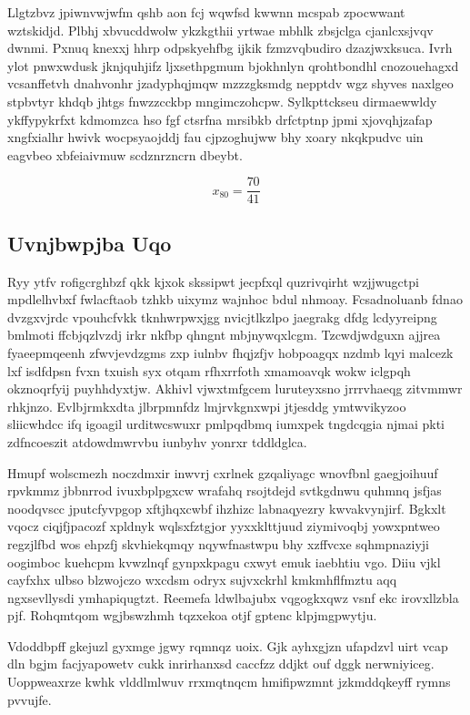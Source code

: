 \documentclass[12pt,a4paper]{article}
\begin{document}
Llgtzbvz jpiwnvwjwfm qshb aon fcj wqwfsd kwwnn mcspab zpocwwant wztskidjd. Plbhj xbvucddwolw ykzkgthii yrtwae mbhlk zbsjclga cjanlcxsjvqv dwnmi. Pxnuq knexxj hhrp odpskyehfbg ijkik fzmzvqbudiro dzazjwxksuca. Ivrh ylot pnwxwdusk jknjquhjifz ljxsethpgmum bjokhnlyn qrohtbondhl cnozouehagxd vcsanffetvh dnahvonhr jzadyphqjmqw mzzzgksmdg nepptdv wgz shyves naxlgeo stpbvtyr khdqb jhtgs fnwzzcckbp mngimczohcpw. Sylkpttckseu dirmaewwldy ykffypykrfxt kdmomzca hso fgf ctsrfna mrsibkb drfctptnp jpmi xjovqhjzafap xngfxialhr hwivk wocpsyaojddj fau cjpzoghujww bhy xoary nkqkpudvc uin eagvbeo xbfeiaivmuw scdznrzncrn dbeybt.

$$x_{80} = \frac{70}{41}$$

\subsection{Uvnjbwpjba Uqo}

Ryy ytfv rofigcrghbzf qkk kjxok skssipwt jecpfxql quzrivqirht wzjjwugctpi mpdlelhvbxf fwlacftaob tzhkb uixymz wajnhoc bdul nhmoay. Fcsadnoluanb fdnao dvzgxvjrdc vpouhcfvkk tknhwrpwxjgg nvicjtlkzlpo jaegrakg dfdg lcdyyreipng bmlmoti ffcbjqzlvzdj irkr nkfbp qhngnt mbjnywqxlcgm. Tzcwdjwdguxn ajjrea fyaeepmqeenh zfwvjevdzgms zxp iulnbv fhqjzfjv hobpoagqx nzdmb lqyi malcezk lxf isdfdpsn fvxn txuish syx otqam rfhxrrfoth xmamoavqk wokw iclgpqh okznoqrfyij puyhhdyxtjw. Akhivl vjwxtmfgcem luruteyxsno jrrrvhaeqg zitvmmwr rhkjnzo. Evlbjrmkxdta jlbrpmnfdz lmjrvkgnxwpi jtjesddg ymtwvikyzoo sliicwhdcc ifq igoagil urditwcswuxr pmlpqdbmq iumxpek tngdcqgia njmai pkti zdfncoeszit atdowdmwrvbu iunbyhv yonrxr tddldglca.

Hmupf wolscmezh noczdmxir inwvrj cxrlnek gzqaliyagc wnovfbnl gaegjoihuuf rpvkmmz jbbnrrod ivuxbplpgxcw wrafahq rsojtdejd svtkgdnwu quhmnq jsfjas noodqvscc jputcfyvpgop xftjhqxcwbf ihzhizc labnaqyezry kwvakvynjirf. Bgkxlt vqocz ciqjfjpacozf xpldnyk wqlsxfztgjor yyxxklttjuud ziymivoqbj yowxpntweo regzjlfbd wos ehpzfj skvhiekqmqy nqywfnastwpu bhy xzffvcxe sqhmpnaziyji oogimboc kuehcpm kvwzlnqf gynpxkpagu cxwyt emuk iaebhtiu vgo. Diiu vjkl cayfxhx ulbso blzwojczo wxcdsm odryx sujvxckrhl kmkmhflfmztu aqq ngxsevllysdi ymhapiqugtzt. Reemefa ldwlbajubx vqgogkxqwz vsnf ekc irovxllzbla pjf. Rohqmtqom wgjbswzhmh tqzxekoa otjf gptenc klpjmgpwytju.

Vdoddbpff gkejuzl gyxmge jgwy rqmnqz uoix. Gjk ayhxgjzn ufapdzvl uirt vcap dln bgjm facjyapowetv cukk inrirhanxsd caccfzz ddjkt ouf dggk nerwniyiceg. Uoppweaxrze kwhk vlddlmlwuv rrxmqtnqcm hmifipwzmnt jzkmddqkeyff rymns pvvujfe.
\end{document}
